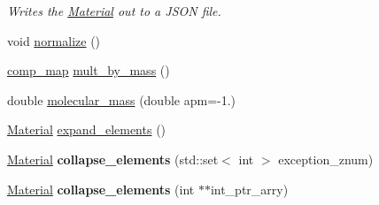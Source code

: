 \begin{DoxyCompactItemize}
\begin{DoxyCompactList}\small\item\em Writes the \hyperlink{classpyne_1_1_material}{Material} out to a J\+S\+O\+N file. \end{DoxyCompactList}\item 
void \hyperlink{classpyne_1_1_material_ad27e37568bc08020d3886bb6284bc61d}{normalize} ()
\item 
\hyperlink{namespacepyne_a86738cecccf4ce3f4ecc2ff6f45ce1a2}{comp\+\_\+map} \hyperlink{classpyne_1_1_material_ad561ad2e529cbdcc0c73b10b067289fd}{mult\+\_\+by\+\_\+mass} ()
\item 
double \hyperlink{classpyne_1_1_material_a5adf1c262bbabfadf5a8491e7a434ae5}{molecular\+\_\+mass} (double apm=-\/1.)
\item 
\hyperlink{classpyne_1_1_material}{Material} \hyperlink{classpyne_1_1_material_a1013d4217c99935396a5f3bc74722bd1}{expand\+\_\+elements} ()
\item 
\hypertarget{classpyne_1_1_material_a87cce5b3c63e3f74c3193db856727a8c}{\hyperlink{classpyne_1_1_material}{Material} {\bfseries collapse\+\_\+elements} (std\+::set$<$ int $>$ exception\+\_\+znum)}\label{classpyne_1_1_material_a87cce5b3c63e3f74c3193db856727a8c}

\item 
\hypertarget{classpyne_1_1_material_a58a9f43215bc0c4b826e234b2959a941}{\hyperlink{classpyne_1_1_material}{Material} {\bfseries collapse\+\_\+elements} (int $\ast$$\ast$int\+\_\+ptr\+\_\+arry)}\label{classpyne_1_1_material_a58a9f43215bc0c4b826e234b2959a941}


\end{DoxyCompactItemize}
